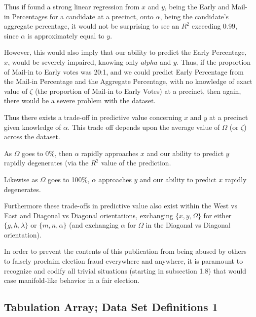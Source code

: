 Thus if found a strong linear regression from $x$ and $y$, being the Early and Mail-in Percentages for a candidate at a precinct, onto $\alpha$, being the candidate's aggregate percentage, it would not be surprising to see an $R^2$ exceeding 0.99, since $\alpha$ is approximately equal to $y$.

However, this would also imply that our ability to predict the Early Percentage, $x$, would be severely impaired, knowing only $alpha$ and $y$. Thus, if the proportion of Mail-in to Early votes was 20:1, and we could predict Early Percentage from the Mail-in Percentage and the Aggregate Percentage, with no knowledge of exact value of $\zeta$ (the proportion of Mail-in to Early Votes) at a precinct, then again, there would be a severe problem with the dataset.

Thus there exists a trade-off in predictive value concerning $x$ and $y$ at a precinct given knowledge of $\alpha$. This trade off depends upon the average value of $\Omega$ (or $\zeta$) across the dataset.  

As $\Omega$ goes to 0\%, then $\alpha$ rapidly approaches $x$ and our ability to predict $y$ rapidly degenerates (via the $R^2$ value of the prediction.

Likewise as $\Omega$ goes to 100\%, $\alpha$ approaches $y$ and our ability to predict $x$ rapidly degenerates.

Furthermore these trade-offs in predictive value also exist within the West vs East and Diagonal vs Diagonal orientations, exchanging $\{x,y,\Omega\}$ for either $\{g,h,\lambda\}$ or $\{m,n,\alpha\}$ (and exchanging $\alpha$ for $\Omega$ in the Diagonal vs Diagonal orientation).

In order to prevent the contents of this publication from being abused by others to falsely proclaim election fraud everywhere and anywhere, it is paramount to recognize and codify all trivial situations (starting in subsection 1.8) that would case manifold-like behavior in a fair election.
\newpage
\subsection{Tabulation Array; Data Set Definitions 1}

